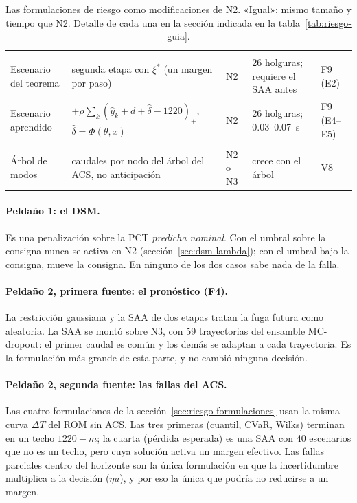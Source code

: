 \begin{table}[H]
\begin{tabularx}{\linewidth}{@{}>{\raggedright\arraybackslash}p{24mm} >{\raggedright\arraybackslash}p{50mm} >{\raggedright\arraybackslash}p{16mm} Y >{\raggedright\arraybackslash}p{14mm}@{}}
\\
Escenario del teorema & segunda etapa con $\xi^*$ (un margen por paso) & N2 & 26 holguras; requiere el SAA antes & F9 (E2)\\
Escenario aprendido & $+\rho\sum_k(\hat y_k+d+\hat\delta-1220)_+$, $\hat\delta=\Phi(\theta,x)$ & N2 & 26 holguras; 0.03--0.07~s & F9 (E4--E5)\\
\\
Árbol de modos & caudales por nodo del árbol del ACS, no anticipación & N2 o N3 & crece con el árbol & V8\\\bottomrule
\end{tabularx}
\caption{Las formulaciones de riesgo como modificaciones de N2. «Igual»: mismo tamaño y tiempo
que N2. Detalle de cada una en la sección indicada en la tabla~\ref{tab:riesgo-guia}.}
\label{tab:riesgo-formulaciones-n2}
\end{table}

\paragraph{Peldaño 1: el DSM.} Es una penalización sobre la PCT \emph{predicha nominal}. Con el
umbral sobre la consigna nunca se activa en N2 (sección~\ref{sec:dsm-lambda}); con el umbral bajo
la consigna, mueve la consigna. En ninguno de los dos casos sabe nada de la falla.

\paragraph{Peldaño 2, primera fuente: el pronóstico (F4).} La restricción gaussiana y la SAA de
dos etapas tratan la fuga futura como aleatoria. La SAA se montó sobre N3, con 59 trayectorias
del ensamble MC-dropout: el primer caudal es común y los demás se adaptan a cada trayectoria. Es
la formulación más grande de esta parte, y no cambió ninguna decisión.

\paragraph{Peldaño 2, segunda fuente: las fallas del ACS.} Las cuatro formulaciones de la
sección~\ref{sec:riesgo-formulaciones} usan la misma curva $\Delta T$ del ROM sin ACS. Las tres
primeras (cuantil, CVaR, Wilks) terminan en un techo $1220-m$; la cuarta (pérdida esperada) es
una SAA con 40 escenarios que no es un techo, pero cuya solución activa un margen efectivo. Las
fallas parciales dentro del horizonte son la única formulación en que la incertidumbre multiplica
a la decisión ($\eta u$), y por eso la única que podría no reducirse a un margen.

